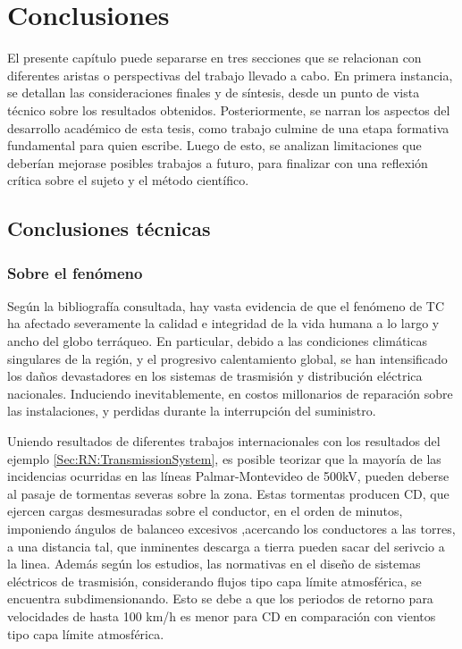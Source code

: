 \chapter{Conclusiones}\label{Cap:Conlcusiones}
\linenumbers

El presente capítulo puede separarse en tres secciones que se relacionan con diferentes aristas o perspectivas del trabajo llevado a cabo. En primera instancia, se detallan las consideraciones finales y de síntesis, desde un punto de vista técnico sobre los resultados obtenidos. Posteriormente, se narran los aspectos del desarrollo académico de esta tesis, como trabajo culmine de una etapa formativa fundamental para quien escribe. Luego de esto, se analizan limitaciones que deberían mejorase posibles trabajos a futuro, para finalizar con una reflexión crítica sobre el sujeto y el método científico. 

\section{Conclusiones técnicas}

\subsection{Sobre el fenómeno}
Según la bibliografía consultada, hay vasta evidencia de que el fenómeno de \gls{TC} ha afectado severamente la calidad e integridad de la vida humana a lo largo y ancho del globo terráqueo. En particular, debido a las condiciones climáticas singulares de la región, y el progresivo calentamiento global, se han intensificado los daños devastadores en los sistemas de trasmisión y distribución eléctrica nacionales. Induciendo inevitablemente, en costos millonarios de reparación sobre las instalaciones, y perdidas durante la interrupción del suministro. 

Uniendo resultados de diferentes trabajos internacionales con los resultados del  ejemplo \ref{Sec:RN:TransmissionSystem}, es posible teorizar que la mayoría de las incidencias ocurridas en las líneas Palmar-Montevideo de 500kV, pueden deberse al pasaje de tormentas severas sobre la zona. Estas tormentas producen CD, que ejercen cargas desmesuradas sobre el conductor, en el orden de minutos, imponiendo ángulos de balanceo excesivos ,acercando los conductores a las torres, a una distancia tal, que inminentes descarga a tierra pueden sacar del serivcio a la linea. Además según los estudios, las normativas en el diseño de sistemas eléctricos de trasmisión, considerando flujos tipo capa límite atmosférica, se encuentra subdimensionando. Esto se debe a que los periodos de retorno para velocidades de hasta 100 km/h es menor para CD en comparación con vientos tipo capa límite atmosférica. 

